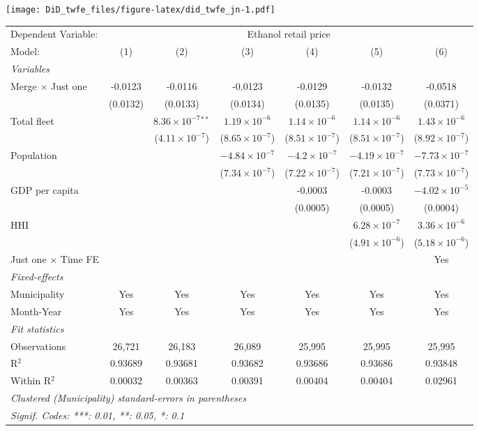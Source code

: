 \documentclass[
]{article}
\begin{document}
\texttt{[image: DiD\_twfe\_files/figure-latex/did\_twfe\_jn-1.pdf]}

\begin{tabular}{lcccccc}
\tabularnewline\midrule\midrule
Dependent Variable:&\multicolumn{6}{c}{Ethanol retail price}\\
Model:&(1) & (2) & (3) & (4) & (5) & (6)\\
\midrule \emph{Variables}&   &   &   &   &   &  \\
Merge $\times $ Just one & -0.0123 & -0.0116 & -0.0123 & -0.0129 & -0.0132 & -0.0518\\
  &(0.0132) & (0.0133) & (0.0134) & (0.0135) & (0.0135) & (0.0371)\\
Total fleet &    & $8.36\times 10^{-7}$$^{**}$ & $1.19\times 10^{-6}$ & $1.14\times 10^{-6}$ & $1.14\times 10^{-6}$ & $1.43\times 10^{-6}$\\
  &   & ($4.11\times 10^{-7}$) & ($8.65\times 10^{-7}$) & ($8.51\times 10^{-7}$) & ($8.51\times 10^{-7}$) & ($8.92\times 10^{-7}$)\\
Population &    &    & $-4.84\times 10^{-7}$ & $-4.2\times 10^{-7}$ & $-4.19\times 10^{-7}$ & $-7.73\times 10^{-7}$\\
  &   &    & ($7.34\times 10^{-7}$) & ($7.22\times 10^{-7}$) & ($7.21\times 10^{-7}$) & ($7.73\times 10^{-7}$)\\
GDP per capita &    &    &    & -0.0003 & -0.0003 & $-4.02\times 10^{-5}$\\
  &   &    &    & (0.0005) & (0.0005) & (0.0004)\\
HHI &    &    &    &    & $6.28\times 10^{-7}$ & $3.36\times 10^{-6}$\\
  &   &    &    &    & ($4.91\times 10^{-6}$) & ($5.18\times 10^{-6}$)\\
Just one $\times$ Time FE &  &  &  &  &  & Yes\\
\midrule \emph{Fixed-effects}&   &   &   &   &   &  \\
Municipality & Yes & Yes & Yes & Yes & Yes & Yes\\
Month-Year & Yes & Yes & Yes & Yes & Yes & Yes\\
\midrule \emph{Fit statistics}&  & & & & & \\
Observations & 26,721&26,183&26,089&25,995&25,995&25,995\\
R$^2$ & 0.93689&0.93681&0.93682&0.93686&0.93686&0.93848\\
Within R$^2$ & 0.00032&0.00363&0.00391&0.00404&0.00404&0.02961\\
\midrule\midrule\multicolumn{7}{l}{\emph{Clustered (Municipality) standard-errors in parentheses}}\\
\multicolumn{7}{l}{\emph{Signif. Codes: ***: 0.01, **: 0.05, *: 0.1}}\\
\end{tabular}
\end{document}
